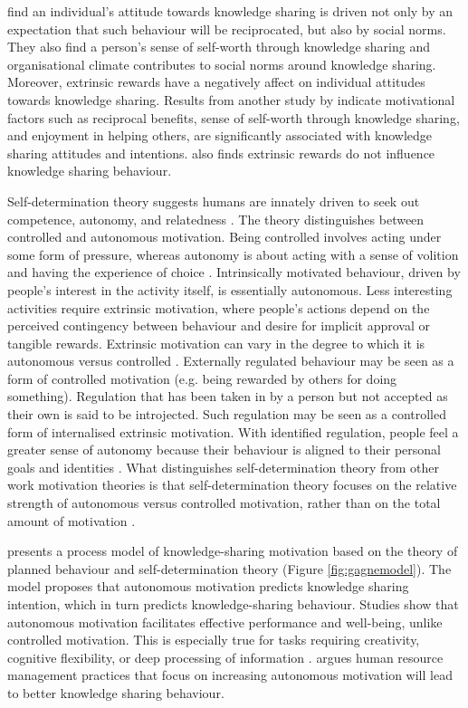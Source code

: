 \citet{bock2005behavioral} find an individual's attitude towards knowledge sharing is driven not only by an expectation that such behaviour will be reciprocated, but also by social norms. They also find a person's sense of self-worth through knowledge sharing and organisational climate contributes to social norms around knowledge sharing. Moreover, extrinsic rewards have a negatively affect on individual attitudes towards knowledge sharing. Results from another study by \citet{lin2007effects} indicate motivational factors such as reciprocal benefits, sense of self-worth through knowledge sharing, and enjoyment in helping others, are significantly associated with knowledge sharing attitudes and intentions. \citet{lin2007effects} also finds extrinsic rewards do not influence knowledge sharing behaviour. \medskip

Self-determination theory suggests humans are innately driven to seek out competence, autonomy, and relatedness \citep{deci1985general,ryan2000self}. The theory distinguishes between controlled and autonomous motivation. Being controlled involves acting under some form of pressure, whereas autonomy is about acting with a sense of volition and having the experience of choice \citep{gagne2005self}. Intrinsically motivated behaviour, driven by people’s interest in the activity itself, is essentially autonomous. Less interesting activities require extrinsic motivation, where people's actions depend on the perceived contingency between behaviour and desire for implicit approval or tangible rewards. Extrinsic motivation can vary in the degree to which it is autonomous versus controlled \citep{gagne2005self}. Externally regulated behaviour may be seen as a form of controlled motivation (e.g. being rewarded by others for doing something). Regulation that has been taken in by a person but not accepted as their own is said to be introjected. Such regulation may be seen as a controlled form of internalised extrinsic motivation. With identified regulation, people feel a greater sense of autonomy because their behaviour is aligned to their personal goals and identities \citep{gagne2005self}. What distinguishes self-determination theory from other work motivation theories is that self-determination theory focuses on the relative strength of autonomous versus controlled motivation, rather than on the total amount of motivation \citep{gagne2005self}. \medskip

\citet{gagne2009model} presents a process model of knowledge-sharing motivation based on the theory of planned behaviour and self-determination theory (Figure \ref{fig:gagnemodel}). The model proposes that autonomous motivation predicts knowledge sharing intention, which in turn predicts knowledge-sharing behaviour. Studies show that autonomous motivation facilitates effective performance and well-being, unlike controlled motivation. This is especially true for tasks requiring creativity, cognitive flexibility, or deep processing of information \citep{gagne2005self}. \citet{gagne2009model} argues human resource management practices that focus on increasing autonomous motivation will lead to better knowledge sharing behaviour. \medskip

